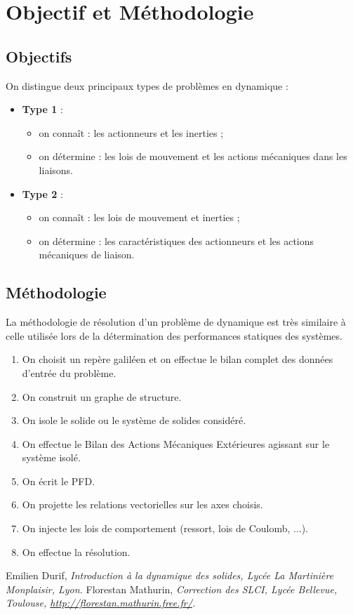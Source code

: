 \documentclass[10pt,fleqn]{article} %
\begin{document}
\section{Objectif et Méthodologie}

\subsection{Objectifs}
On distingue deux principaux types de problèmes en dynamique : 
\begin{itemize}
\item \textbf{Type 1} :
\begin{itemize}
\item on connaît : les actionneurs et les inerties ;
\item on détermine : les lois de mouvement et les actions mécaniques dans les liaisons.
\end{itemize} 
\item \textbf{Type 2} :
\begin{itemize}
\item on connaît : les lois de mouvement et inerties ;
\item on détermine : les caractéristiques des actionneurs et les actions mécaniques de liaison.
\end{itemize}
\end{itemize}

\subsection{Méthodologie}
La méthodologie de résolution d'un problème de dynamique est très similaire à celle utilisée lors de la détermination des performances statiques des systèmes.

\begin{enumerate}
\item On choisit un repère galiléen et on effectue le bilan complet des données d'entrée du problème.
\item On construit un graphe de structure.
\item On isole le solide ou le système de solides considéré.
\item On effectue le Bilan des Actions Mécaniques Extérieures agissant sur le système isolé.
\item On écrit le PFD.
\item On projette les relations vectorielles sur les axes choisis.
\item On injecte les lois de comportement (ressort, lois de Coulomb, ...).
\item On effectue la résolution.
\end{enumerate}



\begin{thebibliography}{2}
    Emilien Durif, {\it Introduction à la dynamique des solides, Lycée La Martinière Monplaisir, Lyon.}
       Florestan Mathurin, {\it Correction des SLCI, Lycée Bellevue, Toulouse, \url{http://florestan.mathurin.free.fr/}.}



\end{thebibliography}
\end{document}
